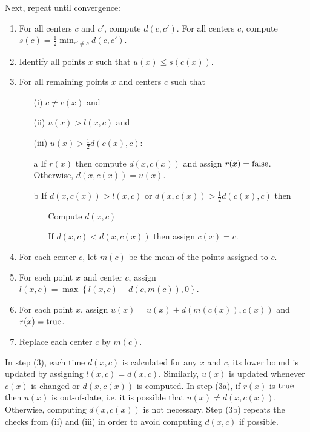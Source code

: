 Next, repeat until convergence:
\begin{enumerate} \itemsep-2pt
  \item For all centers \( c \) and \( c' \), compute \( d(c, c') \). For all centers \( c \), compute \( s(c) = \frac{1}{2} \min_{c'\ne c}d(c, c') \).
  \item Identify all points \( x \) such that \( u(x) \le s(c(x)) \).
  \item For all remaining points \( x \) and centers \( c \) such that
     \begin{enumerate} \itemsep-1.5pt
       \item[(i)] \( c \ne c(x) \) and
       \item[(ii)] \( u(x) > l(x, c) \) and
       \item[(iii)] \( u(x) > \frac{1}{2} d(c(x), c) \):
     \end{enumerate}
     \begin{enumerate} \itemsep-1.5pt
       \item[a] If \( r(x) \) then compute \( d(x, c(x)) \) and assign \( r(x) = \mathrm{false} \). Otherwise, \( d(x, c(x)) = u(x) \).
       \item[b] If \( d(x, c(x)) > l(x, c) \) or \( d(x, c(x)) > \frac{1}{2} d(c(x), c) \) then
         \begin{itemize} \itemsep-1.5pt
           \item[ ] Compute \( d(x, c) \)
           \item[ ] If \( d(x, c) < d(x, c(x)) \) then assign \( c(x) = c \).
         \end{itemize}
     \end{enumerate}
  \item For each center \( c \), let \( m(c) \) be the mean of the points assigned to \( c \).

  \item For each point \( x \) and center \( c \), assign \( l(x, c) = \max\left\{l(x, c) - d(c, m(c)), 0\right\} \).

  \item For each point \( x \), assign \( u(x) = u(x) + d(m(c(x)), c(x)) \) and \( r(x) = \mathrm{true} \).

  \item Replace each center \( c \) by \( m(c) \).
\end{enumerate}

In step (3), each time \( d(x, c) \) is calculated for any \( x \) and \( c \), its lower bound is updated by assigning \( l(x, c) = d(x, c) \). Similarly, \( u(x) \) is updated whenever \( c(x) \) is changed or \( d(x, c(x)) \) is computed. In step (3a), if \( r(x) \) is \( \mathrm{true} \) then \( u(x) \) is out-of-date, i.e. it is possible that \( u(x) \ne d(x, c(x)) \). Otherwise, computing \( d(x, c(x)) \) is not necessary. Step (3b) repeats the checks from (ii) and (iii) in order to avoid computing \( d(x, c) \) if possible.

